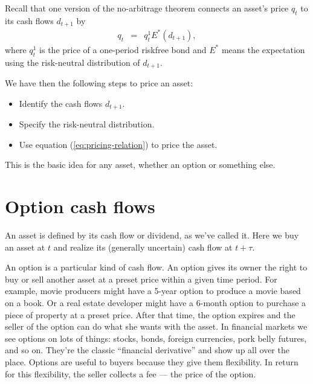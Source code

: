 \documentclass[11pt]{article}
\begin{document}
Recall that one version of the no-arbitrage theorem connects an asset's price $q_t$
to its cash flows $d_{t+1}$ by
\begin{eqnarray}
    q_t &=& q^1_t E^* \left( d_{t+1} \right) ,
    \label{eq:pricing-relation}
\end{eqnarray}
where $q^1_t$ is the price of a one-period riskfree bond
and $E^*$ means the expectation using the risk-neutral distribution
of $d_{t+1}$.

We have then the following steps to price an asset:
\begin{itemize}
\item Identify the cash flows $d_{t+1}$.
\item Specify the risk-neutral distribution.
\item Use equation (\ref{eq:pricing-relation}) to price the asset.
\end{itemize}
This is the basic idea for any asset,
whether an option or something else.


\section{Option cash flows}

An asset is defined by its cash flow or dividend, as we've called it.
Here we buy an asset at $t$ and realize its (generally uncertain) cash flow at $t+\tau$.

An option is a particular kind of cash flow.
An option gives its owner the right to buy or sell another asset at a preset price
within a given time period.
For example, movie producers might have a 5-year option to produce a
movie based on a book.
Or a real estate developer might have a 6-month option to purchase
a piece of property at a preset price.
After that time, the option expires and
the seller of the option can do what she wants with the asset.
In financial markets we see options on lots of things:  stocks, bonds,
foreign currencies, pork belly futures, and so on.
They're the classic ``financial derivative'' and show up all over the place.
Options are useful to buyers because they give them flexibility.
In return for this flexibility, the seller collects a fee --- the price
of the option.
\end{document}
